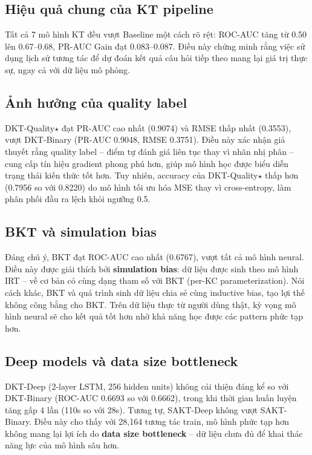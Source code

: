 \documentclass[12pt, a4paper]{report}
\begin{document}
\subsection{Hiệu quả chung của KT pipeline}

Tất cả 7 mô hình KT đều vượt Baseline một cách rõ rệt: ROC-AUC tăng từ 0.50 lên 0.67--0.68, PR-AUC Gain đạt 0.083--0.087. Điều này chứng minh rằng việc sử dụng lịch sử tương tác để dự đoán kết quả câu hỏi tiếp theo mang lại giá trị thực sự, ngay cả với dữ liệu mô phỏng.

\subsection{Ảnh hưởng của quality label}

DKT-Quality$\star$ đạt PR-AUC cao nhất (0.9074) và RMSE thấp nhất (0.3553), vượt DKT-Binary (PR-AUC 0.9048, RMSE 0.3751). Điều này xác nhận giả thuyết rằng quality label -- điểm tự đánh giá liên tục thay vì nhãn nhị phân -- cung cấp tín hiệu gradient phong phú hơn, giúp mô hình học được biểu diễn trạng thái kiến thức tốt hơn. Tuy nhiên, accuracy của DKT-Quality$\star$ thấp hơn (0.7956 so với 0.8220) do mô hình tối ưu hóa MSE thay vì cross-entropy, làm phân phối đầu ra lệch khỏi ngưỡng 0.5.

\subsection{BKT và simulation bias}

Đáng chú ý, BKT đạt ROC-AUC cao nhất (0.6767), vượt tất cả mô hình neural. Điều này được giải thích bởi \textbf{simulation bias}: dữ liệu được sinh theo mô hình IRT -- về cơ bản có cùng dạng tham số với BKT (per-KC parameterization). Nói cách khác, BKT và quá trình sinh dữ liệu chia sẻ cùng inductive bias, tạo lợi thế không công bằng cho BKT. Trên dữ liệu thực từ người dùng thật, kỳ vọng mô hình neural sẽ cho kết quả tốt hơn nhờ khả năng học được các pattern phức tạp hơn.

\subsection{Deep models và data size bottleneck}

DKT-Deep (2-layer LSTM, 256 hidden units) không cải thiện đáng kể so với DKT-Binary (ROC-AUC 0.6693 so với 0.6662), trong khi thời gian huấn luyện tăng gấp 4 lần (110s so với 28s). Tương tự, SAKT-Deep không vượt SAKT-Binary. Điều này cho thấy với 28{,}164 tương tác train, mô hình phức tạp hơn không mang lại lợi ích do \textbf{data size bottleneck} -- dữ liệu chưa đủ để khai thác năng lực của mô hình sâu hơn.
\end{document}
